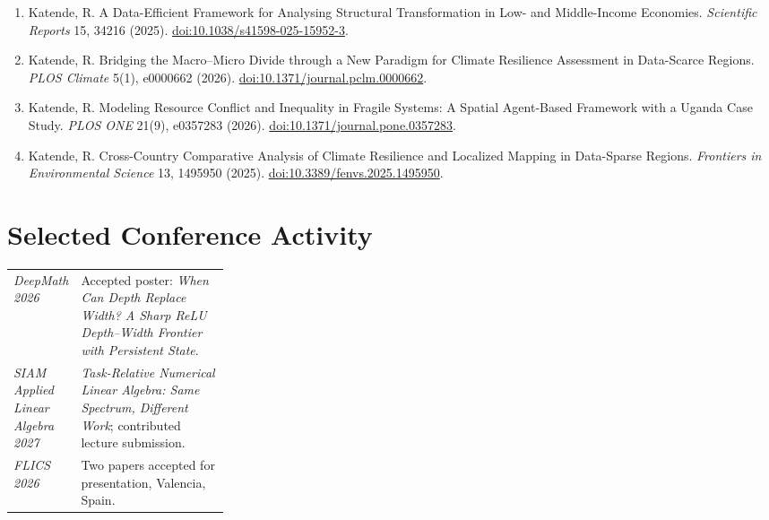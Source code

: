 \documentclass[11pt,a4paper]{article}
\begin{document}
\begin{enumerate}
\item
Katende, R.
A Data-Efficient Framework for Analysing Structural Transformation
in Low- and Middle-Income Economies.
\textit{Scientific Reports}
15, 34216 (2025).
\href{https://doi.org/10.1038/s41598-025-15952-3}
{doi:10.1038/s41598-025-15952-3}.

\item
Katende, R.
Bridging the Macro--Micro Divide through a New Paradigm for Climate
Resilience Assessment in Data-Scarce Regions.
\textit{PLOS Climate}
5(1), e0000662 (2026).
\href{https://doi.org/10.1371/journal.pclm.0000662}
{doi:10.1371/journal.pclm.0000662}.

\item
Katende, R.
Modeling Resource Conflict and Inequality in Fragile Systems:
A Spatial Agent-Based Framework with a Uganda Case Study.
\textit{PLOS ONE}
21(9), e0357283 (2026).
\href{https://doi.org/10.1371/journal.pone.0357283}
{doi:10.1371/journal.pone.0357283}.

\item
Katende, R.
Cross-Country Comparative Analysis of Climate Resilience and
Localized Mapping in Data-Sparse Regions.
\textit{Frontiers in Environmental Science}
13, 1495950 (2025).
\href{https://doi.org/10.3389/fenvs.2025.1495950}
{doi:10.3389/fenvs.2025.1495950}.

\end{enumerate}

\section{Selected Conference Activity}

\begin{tabularx}{\linewidth}
{@{}>{\raggedright\arraybackslash}p{0.28\linewidth} X@{}}

\textit{DeepMath 2026}
&
Accepted poster:
\textit{When Can Depth Replace Width? A Sharp ReLU Depth--Width
Frontier with Persistent State}.
\\[3pt]

\textit{SIAM Applied Linear Algebra 2027}
&
\textit{Task-Relative Numerical Linear Algebra:
Same Spectrum, Different Work};
contributed lecture submission.
\\[3pt]

\textit{FLICS 2026}
&
Two papers accepted for presentation, Valencia, Spain.

\end{tabularx}

\end{document}
